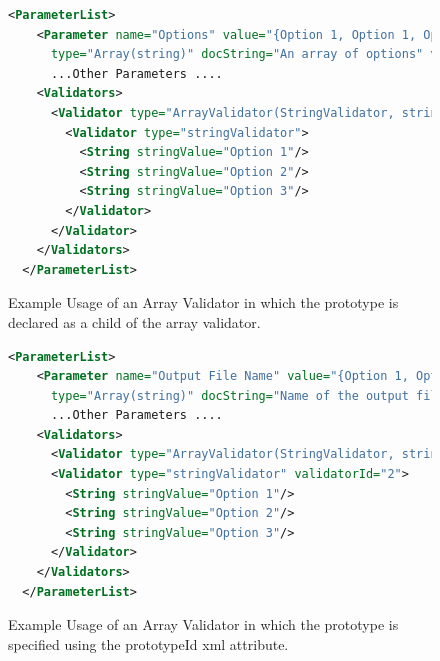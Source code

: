 \begin{figure}
  \centering
  \begin{lstlisting}[language=XML]
  <ParameterList>
    <Parameter name="Options" value="{Option 1, Option 1, Option 1}" 
      type="Array(string)" docString="An array of options" validatorId="1" />
      ...Other Parameters ....
    <Validators>
      <Validator type="ArrayValidator(StringValidator, string)" validatorId="1">
        <Validator type="stringValidator">
          <String stringValue="Option 1"/>
          <String stringValue="Option 2"/>
          <String stringValue="Option 3"/>
        </Validator>
      </Validator>
    </Validators>
  </ParameterList>
  \end{lstlisting}
  \caption{Example Usage of an Array Validator in which the prototype is declared as a child of the array validator.}
  \label{actualArrayValidatorXML}
\end{figure}
\begin{figure}
  \centering
  \begin{lstlisting}[language=XML]
  <ParameterList>
    <Parameter name="Output File Name" value="{Option 1, Option 1, Option 1" 
      type="Array(string)" docString="Name of the output file." validatorId="1" />
      ...Other Parameters ....
    <Validators>
      <Validator type="ArrayValidator(StringValidator, string)" validatorId="1" prototypeId="2"/>
      <Validator type="stringValidator" validatorId="2">
        <String stringValue="Option 1"/>
        <String stringValue="Option 2"/>
        <String stringValue="Option 3"/>
      </Validator>
    </Validators>
  </ParameterList>
  \end{lstlisting}
  \caption{Example Usage of an Array Validator in which the prototype is specified using the prototypeId xml attribute.}
  \label{protoAttributeArrayXML}
\end{figure}

